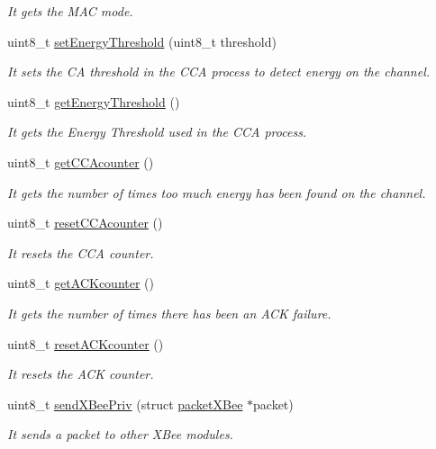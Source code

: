 \begin{DoxyCompactItemize}
\begin{DoxyCompactList}\small\item\em It gets the M\+AC mode. \end{DoxyCompactList}\item 
uint8\+\_\+t \hyperlink{class_wasp_x_bee802_aa25706b23c0e73b9c087ea9d8660d721}{set\+Energy\+Threshold} (uint8\+\_\+t threshold)
\begin{DoxyCompactList}\small\item\em It sets the CA threshold in the C\+CA process to detect energy on the channel. \end{DoxyCompactList}\item 
uint8\+\_\+t \hyperlink{class_wasp_x_bee802_a6786806d765df7b7014d8a63bb734b03}{get\+Energy\+Threshold} ()
\begin{DoxyCompactList}\small\item\em It gets the Energy Threshold used in the C\+CA process. \end{DoxyCompactList}\item 
uint8\+\_\+t \hyperlink{class_wasp_x_bee802_a2b954c48b998e79c786c14cd17f69683}{get\+C\+C\+Acounter} ()
\begin{DoxyCompactList}\small\item\em It gets the number of times too much energy has been found on the channel. \end{DoxyCompactList}\item 
uint8\+\_\+t \hyperlink{class_wasp_x_bee802_a27f0c74090f27fe98693f364261ef37a}{reset\+C\+C\+Acounter} ()
\begin{DoxyCompactList}\small\item\em It resets the C\+CA counter. \end{DoxyCompactList}\item 
uint8\+\_\+t \hyperlink{class_wasp_x_bee802_a31cef979f0d1a23d5b40bf6761444e03}{get\+A\+C\+Kcounter} ()
\begin{DoxyCompactList}\small\item\em It gets the number of times there has been an A\+CK failure. \end{DoxyCompactList}\item 
uint8\+\_\+t \hyperlink{class_wasp_x_bee802_a6321f418f50c9ff79f2f03693ada0eb9}{reset\+A\+C\+Kcounter} ()
\begin{DoxyCompactList}\small\item\em It resets the A\+CK counter. \end{DoxyCompactList}\item 
uint8\+\_\+t \hyperlink{class_wasp_x_bee802_a2a737f55f83b9da93c5c8dafdb8b24b5}{send\+X\+Bee\+Priv} (struct \hyperlink{structpacket_x_bee}{packet\+X\+Bee} $\ast$packet)
\begin{DoxyCompactList}\small\item\em It sends a packet to other X\+Bee modules. \end{DoxyCompactList}\end{DoxyCompactItemize}
